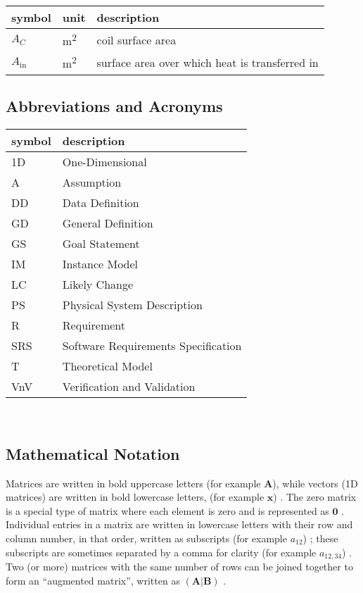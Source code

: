\documentclass[12pt]{article}
\begin{document}
\newpage

\renewcommand{\arraystretch}{1.2}
\noindent \begin{longtable*}{l l p{12cm}} \toprule
\textbf{symbol} & \textbf{unit} & \textbf{description}\\
\midrule 
$A_C$ & \si[per-mode=symbol] {\square\metre} & coil surface area
\\
$A_\text{in}$ & \si[per-mode=symbol] {\square\metre} & surface area over 
which heat is transferred in
\\ 
\bottomrule
\end{longtable*}

\subsection{Abbreviations and Acronyms} \label{sec_abbsAcrs}

\renewcommand{\arraystretch}{1.2}
\begin{tabular}{l l} 
  \toprule		
  \textbf{symbol} & \textbf{description}\\
  \midrule 
  1D & One-Dimensional\\
  A & Assumption\\
  DD & Data Definition\\
  GD & General Definition\\
  GS & Goal Statement\\
  IM & Instance Model\\
  LC & Likely Change\\
  PS & Physical System Description\\
  R & Requirement\\
  SRS & Software Requirements Specification\\
  T & Theoretical Model\\
  VnV & Verification and Validation\\
  \bottomrule
\end{tabular}\\

\subsection{Mathematical Notation} \label{sec_mathNot}

Matrices are written in bold uppercase letters (for example $\textbf{A}$), while
vectors (1D matrices) are written in bold lowercase letters, (for example
$\textbf{x}$) \cite{osullivan_appendix_2010}. The zero matrix is a special type
of matrix where each element is zero and is represented as $\textbf{0}$
\cite{weisstein_zero_2023}. Individual entries in a matrix are written in
lowercase letters with their row and column number, in that order, written as
subscripts (for example $a_{12}$) \cite{osullivan_appendix_2010}; these
subscripts are sometimes separated by a comma for clarity (for example
$a_{12,34}$) \cite{latecki_matrices_2018}. Two (or more) matrices with the same
number of rows can be joined together to form an ``augmented matrix'', written
as $\left(\textbf{A}\vert \textbf{B}\right)$ \cite{taboga_augmented_2021}.
\end{document}
